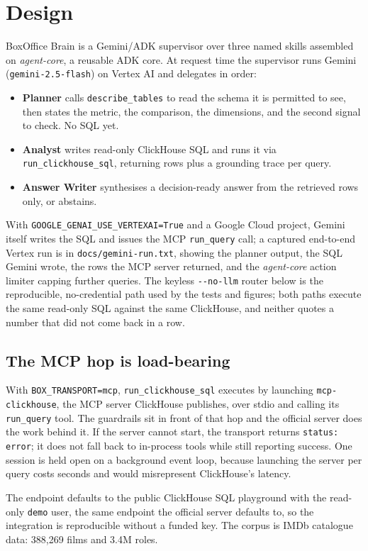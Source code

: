 \documentclass[10pt,twocolumn]{article}
\begin{document}
\section{Design}
BoxOffice Brain is a Gemini/ADK supervisor over three named skills assembled on
\emph{agent-core}, a reusable ADK core. At request time the supervisor runs
Gemini (\texttt{gemini-2.5-flash}) on Vertex AI and delegates in order:
\begin{itemize}
\item \textbf{Planner} calls \texttt{describe\_tables} to read the schema it is
permitted to see, then states the metric, the comparison, the dimensions, and
the second signal to check. No SQL yet.
\item \textbf{Analyst} writes read-only ClickHouse SQL and runs it via
\texttt{run\_clickhouse\_sql}, returning rows plus a grounding trace per query.
\item \textbf{Answer Writer} synthesises a decision-ready answer from the
retrieved rows only, or abstains.
\end{itemize}
With \texttt{GOOGLE\_GENAI\_USE\_VERTEXAI=True} and a Google Cloud project,
Gemini itself writes the SQL and issues the MCP \texttt{run\_query} call; a
captured end-to-end Vertex run is in \texttt{docs/gemini-run.txt}, showing the
planner output, the SQL Gemini wrote, the rows the MCP server returned, and the
\emph{agent-core} action limiter capping further queries. The keyless
\texttt{-{}-no-llm} router below is the reproducible, no-credential path used by
the tests and figures; both paths execute the same read-only SQL against the
same ClickHouse, and neither quotes a number that did not come back in a row.

\subsection{The MCP hop is load-bearing}
With \texttt{BOX\_TRANSPORT=mcp}, \texttt{run\_clickhouse\_sql} executes by
launching \texttt{mcp-clickhouse}, the MCP server ClickHouse publishes, over
stdio and calling its \texttt{run\_query} tool. The guardrails sit in front of
that hop and the official server does the work behind it. If the server cannot
start, the transport returns \texttt{status: error}; it does not fall back to
in-process tools while still reporting success. One session is held open on a
background event loop, because launching the server per query costs seconds and
would misrepresent ClickHouse's latency.

The endpoint defaults to the public ClickHouse SQL playground with the read-only
\texttt{demo} user, the same endpoint the official server defaults to, so the
integration is reproducible without a funded key. The corpus is IMDb catalogue
data: 388{,}269 films and 3.4M roles.
\end{document}

